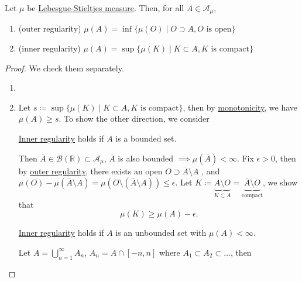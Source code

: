 \begin{theorem}[Regularity]\label{thm:regularity}
	Let \(\mu\) be \hyperref[def:Lebesgue-Stieltjes-measure]{Lebesgue-Stieltjes measure}. Then, for all \(A\in \mathcal{A} _\mu \),
	\begin{enumerate}[(1)]
		\item\label{thm:outer-regularity} (outer regularity) \(\mu (A) = \inf \{\mu (O) \mid O\supset A, O\text{ is open}\}\)
		\item\label{thm:inner-regularity} (inner regularity) \(\mu (A) = \sup \{\mu (K) \mid K\subset A, K\text{ is compact}\}\)
	\end{enumerate}
\end{theorem}
\begin{proof}
	We check them separately.
	\begin{enumerate}[(1)]
		\item {}
		\item Let \(s \coloneqq \sup \{\mu (K) \mid K\subset A, K\text{ is compact} \}\), then by \hyperref[thm:measure-space-monotonicity]{monotonicity}, we have \(\mu (A)\geq s\).
		      To show the other direction, we consider
		      \begin{claim}
			      \hyperref[thm:inner-regularity]{Inner regularity} holds if \(A\) is a bounded set.
		      \end{claim}
		      \begin{explanation}
			      Then \(\overline{A} \in \mathcal{B} (\mathbb{R} )\subset \mathcal{A} _\mu \),
			      \(\overline{A} \) is also bounded \(\implies \mu (\overline{A} ) < \infty \). Fix \(\epsilon >0\), then by \hyperref[thm:outer-regularity]{outer regularity},
			      there exists an open \(O\supset \overline{A} \setminus A\) , and \(\mu (O) - \mu (\overline{A} \setminus A) = \mu (O\setminus (\overline{A} \setminus A))\leq \epsilon \).
			      Let \(K\coloneqq \underbrace{A\setminus O}_{K\subset A} = \underbrace{\overline{A} \setminus O}_{\text{compact}}\), we show that
			      \[
				      \mu (K)\geq \mu (A) - \epsilon .
			      \]
		      \end{explanation}
		      \begin{claim}
			      \hyperref[thm:inner-regularity]{Inner regularity} holds if \(A\) is an unbounded set with \(\mu (A)<\infty \).
		      \end{claim}
		      \begin{explanation}
			      Let \(A = \bigcup\limits_{n=1}^{\infty} A_{n}\), \(A_{n} = A\cap [-n, n]\) where
			      \(A_1\subset A_2\subset \dots  \), then

\end{explanation}
\end{enumerate}
\end{proof}
